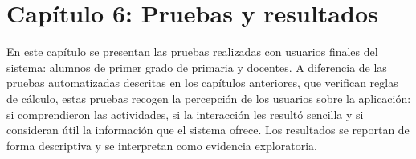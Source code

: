 \section{Capítulo 6: Pruebas y resultados}
\label{sec:pruebas-resultados}

En este capítulo se presentan las pruebas realizadas con usuarios finales del sistema: alumnos de primer grado de primaria y docentes. A diferencia de las pruebas automatizadas descritas en los capítulos anteriores, que verifican reglas de cálculo, estas pruebas recogen la percepción de los usuarios sobre la aplicación: si comprendieron las actividades, si la interacción les resultó sencilla y si consideran útil la información que el sistema ofrece. Los resultados se reportan de forma descriptiva y se interpretan como evidencia exploratoria.






